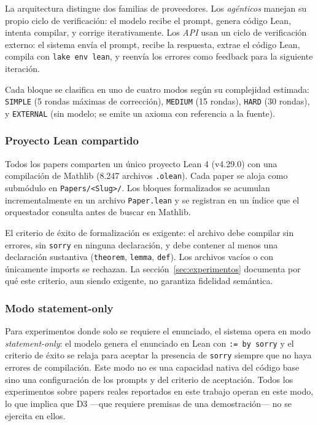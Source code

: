 \documentclass[12pt,a4paper]{article}
\theoremstyle{remark}
\begin{document}
La arquitectura distingue dos familias de proveedores. Los \textit{agénticos} manejan su propio ciclo de verificación: el modelo recibe el prompt, genera código Lean, intenta compilar, y corrige iterativamente. Los \textit{API} usan un ciclo de verificación externo: el sistema envía el prompt, recibe la respuesta, extrae el código Lean, compila con \texttt{lake env lean}, y reenvía los errores como feedback para la siguiente iteración.

Cada bloque se clasifica en uno de cuatro modos según su complejidad estimada: \texttt{SIMPLE} (5 rondas máximas de corrección), \texttt{MEDIUM} (15 rondas), \texttt{HARD} (30 rondas), y \texttt{EXTERNAL} (sin modelo; se emite un axioma con referencia a la fuente).

\subsubsection{Proyecto Lean compartido}

Todos los papers comparten un único proyecto Lean 4 (v4.29.0) con una compilación de Mathlib (8.247 archivos \texttt{.olean}). Cada paper se aloja como submódulo en \texttt{Papers/<Slug>/}. Los bloques formalizados se acumulan incrementalmente en un archivo \texttt{Paper.lean} y se registran en un índice que el orquestador consulta antes de buscar en Mathlib.

El criterio de éxito de formalización es exigente: el archivo debe compilar sin errores, sin \texttt{sorry} en ninguna declaración, y debe contener al menos una declaración sustantiva (\texttt{theorem}, \texttt{lemma}, \texttt{def}). Los archivos vacíos o con únicamente imports se rechazan. La sección~\ref{sec:experimentos} documenta por qué este criterio, aun siendo exigente, no garantiza fidelidad semántica.

\subsubsection{Modo statement-only}

Para experimentos donde solo se requiere el enunciado, el sistema opera en modo \textit{statement-only}: el modelo genera el enunciado en Lean con \texttt{:= by sorry} y el criterio de éxito se relaja para aceptar la presencia de \texttt{sorry} siempre que no haya errores de compilación. Este modo no es una capacidad nativa del código base sino una configuración de los prompts y del criterio de aceptación. Todos los experimentos sobre papers reales reportados en este trabajo operan en este modo, lo que implica que D3 —que requiere premisas de una demostración— no se ejercita en ellos.
\end{document}
